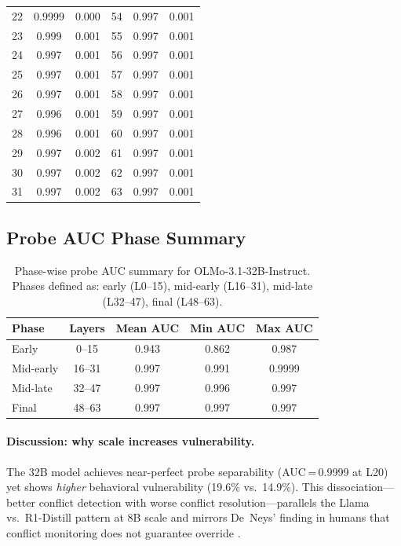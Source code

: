 \documentclass{article}
\begin{document}
\begin{longtable}{rcc|rcc}
22 & 0.9999 & 0.000 & 54 & 0.997 & 0.001 \\
23 & 0.999 & 0.001 & 55 & 0.997 & 0.001 \\
24 & 0.997 & 0.001 & 56 & 0.997 & 0.001 \\
25 & 0.997 & 0.001 & 57 & 0.997 & 0.001 \\
26 & 0.997 & 0.001 & 58 & 0.997 & 0.001 \\
27 & 0.996 & 0.001 & 59 & 0.997 & 0.001 \\
28 & 0.996 & 0.001 & 60 & 0.997 & 0.001 \\
29 & 0.997 & 0.002 & 61 & 0.997 & 0.001 \\
30 & 0.997 & 0.002 & 62 & 0.997 & 0.001 \\
31 & 0.997 & 0.002 & 63 & 0.997 & 0.001 \\
\end{longtable}

\subsection{Probe AUC Phase Summary}

\begin{table}[ht]
\centering
\caption{Phase-wise probe AUC summary for OLMo-3.1-32B-Instruct.
  Phases defined as: early (L0--15), mid-early (L16--31), mid-late
  (L32--47), final (L48--63).}
\label{tab:scale_phase}
\vspace{4pt}
\small
\begin{tabular}{lcccc}
\toprule
\textbf{Phase} & \textbf{Layers} & \textbf{Mean AUC} & \textbf{Min AUC} & \textbf{Max AUC} \\
\midrule
Early      & 0--15  & 0.943 & 0.862 & 0.987 \\
Mid-early  & 16--31 & 0.997 & 0.991 & 0.9999 \\
Mid-late   & 32--47 & 0.997 & 0.996 & 0.997 \\
Final      & 48--63 & 0.997 & 0.997 & 0.997 \\
\bottomrule
\end{tabular}
\end{table}

\paragraph{Discussion: why scale increases vulnerability.}
The 32B model achieves near-perfect probe separability
(AUC\,=\,0.9999 at L20) yet shows \emph{higher} behavioral
vulnerability (19.6\% vs.\ 14.9\%).  This dissociation---better
conflict detection with worse conflict resolution---parallels the
Llama vs.\ R1-Distill pattern at 8B scale and mirrors De~Neys'
finding in humans that conflict monitoring does not guarantee override
\citep{deneys2012bias}.
\end{document}
